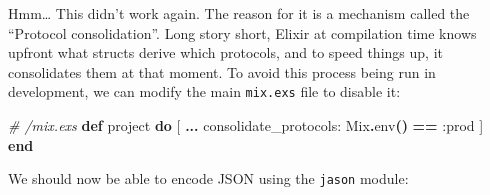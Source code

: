 \documentclass[
  oneside]{book}
\newenvironment{Shaded}{\begin{snugshade}}{\end{snugshade}}
\newcommand{\AttributeTok}[1]{\textcolor[rgb]{0.13,0.29,0.53}{#1}}
\newcommand{\CommentTok}[1]{\textcolor[rgb]{0.56,0.35,0.01}{\textit{#1}}}
\newcommand{\ConstantTok}[1]{\textcolor[rgb]{0.56,0.35,0.01}{#1}}
\newcommand{\ErrorTok}[1]{\textcolor[rgb]{0.64,0.00,0.00}{\textbf{#1}}}
\newcommand{\ExtensionTok}[1]{#1}
\newcommand{\FunctionTok}[1]{\textcolor[rgb]{0.13,0.29,0.53}{\textbf{#1}}}
\newcommand{\KeywordTok}[1]{\textcolor[rgb]{0.13,0.29,0.53}{\textbf{#1}}}
\newcommand{\NormalTok}[1]{#1}
\newcommand{\OperatorTok}[1]{\textcolor[rgb]{0.81,0.36,0.00}{\textbf{#1}}}
\newcommand{\OtherTok}[1]{\textcolor[rgb]{0.56,0.35,0.01}{#1}}
\newcommand{\StringTok}[1]{\textcolor[rgb]{0.31,0.60,0.02}{#1}}
\newcommand{\VariableTok}[1]{\textcolor[rgb]{0.00,0.00,0.00}{#1}}
\begin{document}
\begin{Shaded}
\end{Shaded}

Hmm\ldots{} This didn't work again. The reason for it is a mechanism called the ``Protocol consolidation''. Long story short, Elixir at compilation time knows upfront what structs derive which protocols, and to speed things up, it consolidates them at that moment. To avoid this process being run in development, we can modify the main \texttt{mix.exs} file to disable it:

\begin{Shaded}
\begin{Highlighting}[]
  \CommentTok{\# /mix.exs }
  \KeywordTok{def}\NormalTok{ project }\KeywordTok{do}
    \OtherTok{[}
      \OperatorTok{...}
      \VariableTok{consolidate\_protocols:} \ConstantTok{Mix}\OperatorTok{.}\NormalTok{env}\FunctionTok{()} \OperatorTok{==} \VariableTok{:prod}
    \OtherTok{]}
  \KeywordTok{end}
\end{Highlighting}
\end{Shaded}

We should now be able to encode JSON using the \texttt{jason} module:
\end{document}
